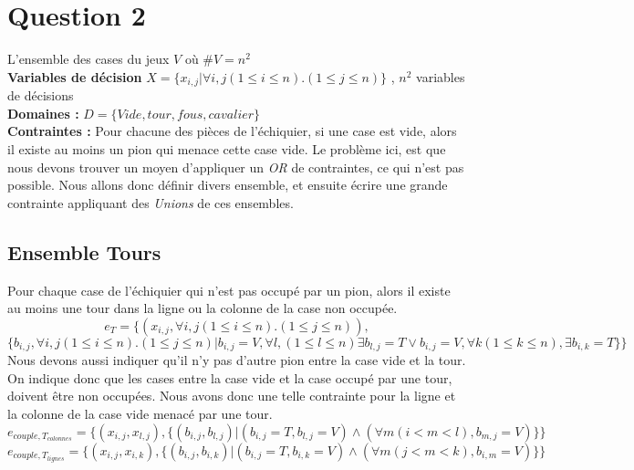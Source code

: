 \documentclass[a4paper,10pt]{article}
\begin{document}
\section{Question 2}
L'ensemble des cases du jeux $V$ où $ \#V = n^2$ \\
\textbf {Variables de décision} $ X = \{x_{i,j} | \forall i,j (1 \leq i \leq n).(1 \leq j \leq n)\}$ , $n^2$ variables de décisions \\
\textbf{Domaines : }
$ D = \{Vide, tour, fous, cavalier \} $\\
\textbf{Contraintes : } Pour chacune des pièces de l'échiquier, si une case est vide, alors il existe au moins un pion qui menace cette case vide. Le problème ici, est que nous devons trouver un moyen d'appliquer un \emph{OR} de contraintes, ce qui n'est pas possible.  Nous allons donc définir divers ensemble, et ensuite écrire une grande contrainte appliquant des \emph{Unions} de ces ensembles.

	\subsection{Ensemble Tours}
		Pour chaque case de l'échiquier qui n'est pas occupé par un pion, alors il existe au moins une tour dans la ligne ou la colonne de la case non occupée.
		$$ e_T = \{(x_{i,j}, \forall i,j (1 \leq i \leq n).(1 \leq j \leq n)),$$ $$\{b_{i,j}, \forall i,j (1 \leq i \leq n).(1 \leq j \leq n)|b_{i,j} = V, \forall l, (1 \leq l \leq n) \exists b_{l,j} = T \lor b_{i,j} = V, \forall k (1 \leq k \leq n), \exists b_{i,k} = T\}\}  $$
			Nous devons aussi indiquer qu'il n'y pas d'autre pion entre la case vide et la tour.  On indique donc que les cases entre la case vide et la case occupé par une tour, doivent être non occupées. Nous avons donc une telle contrainte pour la ligne et la colonne de la case vide menacé par une tour.
		$$ e_{couple,T_{colonnes}} = \{(x_{i,j}, x_{l,j}), \{(b_{i,j}, b_{l,j})|(b_{i,j} = T, b_{l,j} = V) \land ( \forall m (i < m < l), b_{m,j} = V) \}\}$$
		$$ e_{couple,T_{lignes}} = \{(x_{i,j}, x_{i,k}), \{(b_{i,j}, b_{i,k})|(b_{i,j} = T, b_{i,k} = V) \land ( \forall m (j < m < k), b_{i,m} = V) \}\}$$
\end{document}
